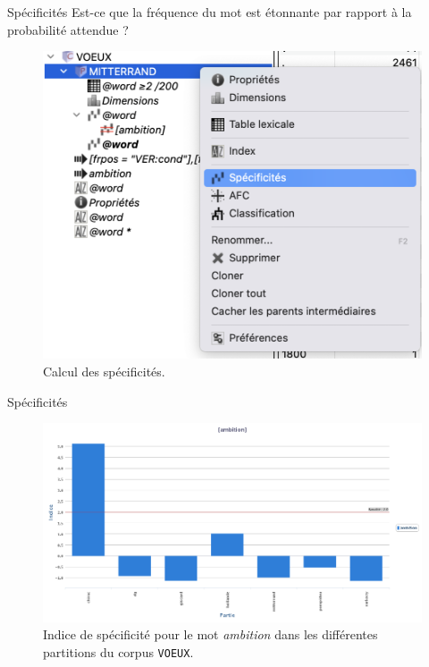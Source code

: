 \documentclass[xetex,xcolor={table,usenames,dvipsnames}]{beamer}
\begin{document}
\begin{frame}{Spécificités}
	Est-ce que la fréquence du mot est étonnante
	par rapport à la probabilité attendue ?
	\begin{figure}[h] %
	\centering
	\includegraphics[width=.6\linewidth]{img/specificites.png}
	\caption{Calcul des spécificités.}
	\label{fig:ling_out_TAL}
\end{figure}
\end{frame}

\begin{frame}{Spécificités}
	\begin{figure}[h] %
		\centering
		\includegraphics[width=1\linewidth]{img/ambition_specificites.png}
		\caption{Indice de spécificité pour le mot \textit{ambition} dans les différentes partitions du corpus \texttt{VOEUX}.}
		\label{fig:ling_out_TAL}
	\end{figure}
\end{frame}
\end{document}
